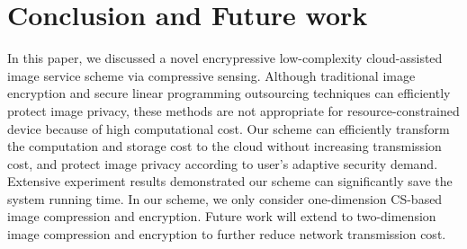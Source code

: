 \documentclass[conference]{IEEEtran}
\begin{document}
\section{Conclusion and Future work}
In this paper, we discussed a novel  encrypressive low-complexity cloud-assisted image service scheme via compressive sensing. Although traditional image encryption  and secure linear programming outsourcing techniques can efficiently protect image privacy, these methods are not appropriate for resource-constrained device because of high computational cost.  Our scheme can efficiently transform the computation and storage cost to the cloud without increasing transmission cost, and protect image privacy according to user's adaptive security demand.  Extensive experiment results demonstrated our scheme can significantly save the system running time. In our scheme, we only consider one-dimension CS-based image compression and encryption. Future work will extend to two-dimension image compression and encryption to further reduce network transmission cost.
\end{document}
